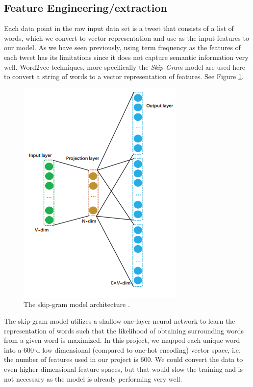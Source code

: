 \documentclass[journal, a4paper]{IEEEtran}
\begin{document}
\subsection{Feature Engineering/extraction}
Each data point in the raw input data set is a tweet that consists of a list of words, which we convert to vector representation and use as the input features to our model. As we have seen previously, using term frequency as the features of each tweet has its limitations since it does not capture semantic information very well. Word2vec techniques, more specifically the \textit{Skip-Gram} model are used here to convert a string of words to a vector representation of features. See Figure \ref{fig:3}.
\begin{figure}[!hbt]
	\centering
	\includegraphics[width=0.8\columnwidth]{word2vec.png}
	\caption{ The skip-gram model architecture \cite{Li-lstm}.}
	\label{fig:3}
\end{figure}

The skip-gram model utilizes a shallow one-layer neural network to learn the representation of words such that the likelihood of obtaining surrounding words from a given word is maximized. In this project, we mapped each unique word into a 600-d low dimensional (compared to one-hot encoding) vector space, i.e. the number of features used in our project is 600. We could convert the data to even higher dimensional feature spaces, but that would slow the training and is not necessary as the model is already performing very well.
\end{document}
